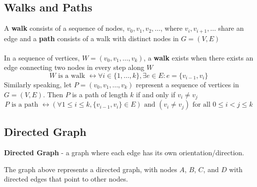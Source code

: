 \subsection{Walks and Paths}
A \textbf{walk} consists of a sequence of nodes, $v_0, v_1, v_2, \dots$, where $v_i, v_{i + 1}, \dots$ share an edge and a \textbf{path} consists of a walk with distinct nodes 
in $G = (V, E)$ \\\\
In a sequence of vertices, $W = (v_0, v_1, \dots, v_k)$, a \textbf{walk} exists  
when there exists an edge connecting two nodes in every step along $W$
\[
  W \text{ is a walk } \leftrightarrow \forall i \in \{1, \dots, k\}, \exists e \in 
  E : e = \{v_{i - 1}, v_i\}
\] 
Similarly speaking, let $P = (v_0, v_1, \dots, v_k)$ represent a sequence of vertices 
in $G = (V, E)$. Then $P$ is a path of length $k$ if and only if $v_i \neq v_j$
\[
  P \text{ is a path } \leftrightarrow (\forall 1 \leq i \leq k, \{v_{i - 1}, 
  v_i\} \in E) \text{ and } (v_i \neq v_j) \text{ for all } 0 \leq i < j \leq k
\]
\subsection{Directed Graph}
\textbf{Directed Graph} - a graph where each edge has its own orientation/direction. 
\begin{center}
\end{center}
The graph above represents a directed graph, with nodes $A$, $B$, $C$, and $D$ with 
directed edges that point to other nodes. 

